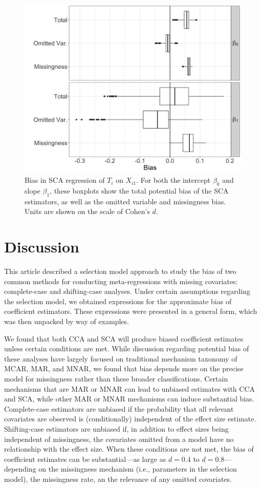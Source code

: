 \documentclass[
]{article}
\begin{document}
\begin{figure}
\begin{center}
\includegraphics[width = .8\textwidth]{../../writeup/cca_paper/graphics/bias_boxplot.jpg}
\end{center}
\caption{Bias in SCA regression of $T_i$ on $X_{i1}$. For both the intercept $\beta_0$ and slope $\beta_1$, these boxplots show the total potential bias of the SCA estimators, as well as the omitted variable and missingness bias. Units are shown on the scale of Cohen's $d$.}
\label{fig:bias-box}
\end{figure}

\hypertarget{discussion}{%
\section{Discussion}\label{discussion}}

This article described a selection model approach to study the bias of two common methods for conducting meta-regressions with missing covariates: complete-case and shifting-case analyses.
Under certain assumptions regarding the selection model, we obtained expressions for the approximate bias of coefficient estimators.
These expressions were presented in a general form, which was then unpacked by way of examples.

We found that both CCA and SCA will produce biased coefficient estimates unless certain conditions are met.
While discussion regarding potential bias of these analyses have largely focused on traditional mechanism taxonomy of MCAR, MAR, and MNAR, we found that bias depends more on the precise model for missingness rather than these broader classifications.
Certain mechanisms that are MAR or MNAR can lead to unbiased estimates with CCA and SCA, while other MAR or MNAR mechanisms can induce substantial bias.
Complete-case estimators are unbiased if the probability that all relevant covariates are observed is (conditionally) independent of the effect size estimate.
Shifting-case estimators are unbiased if, in addition to effect sizes being independent of missingness, the covariates omitted from a model have no relationship with the effect size.
When these conditions are not met, the bias of coefficient estimates can be substantial---as large as \(d = 0.4\) to \(d = 0.8\)---depending on the missingness mechanism (i.e., parameters in the selection model), the missingness rate, an the relevance of any omitted covariates.
\end{document}

